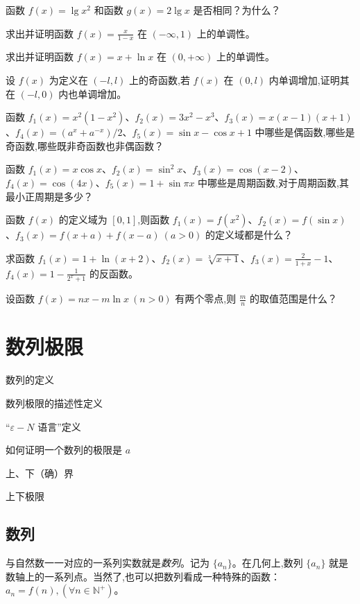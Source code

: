 \documentclass[lang=cn,10pt,twoside]{elegantbook}
\begin{document}
\begin{problemset}
  \item 函数 $f(x) = \lg x^2$ 和函数 $g(x) = 2 \lg x$ 是否相同？为什么？
  \item 求出并证明函数 $f(x) = \frac{x}{1-x}$ 在 $(-\infty, 1)$ 上的单调性。
  \item 求出并证明函数 $f(x) = x + \ln x$ 在 $(0, +\infty)$ 上的单调性。
  \item 设 $f(x)$ 为定义在 $(-l, l)$ 上的奇函数,若 $f(x)$ 在 $(0,l)$ 内单调增加,证明其在 $(-l, 0)$ 内也单调增加。
  \item 函数 $f_1(x) = x^2(1-x^2)$、$f_2(x) = 3x^2 - x^3$、$f_3(x) = x(x-1)(x+1)$、$f_4(x) = (a^x + a^{-x})/2$、$f_5(x) = \sin x - \cos x + 1$ 中哪些是偶函数,哪些是奇函数,哪些既非奇函数也非偶函数？
  \item 函数 $f_1(x) = x \cos x$、$f_2(x) = \sin^2 x$、$f_3(x) = \cos(x-2)$、$f_4(x) = \cos (4x)$、$f_5(x) = 1 + \sin \pi x$ 中哪些是周期函数,对于周期函数,其最小正周期是多少？
  \item 函数 $f(x)$ 的定义域为 $[0,1]$,则函数 $f_1(x)=f(x^2)$、$f_2(x)=f(\sin x)$、$f_3(x)=f(x+a) + f(x-a)\ (a>0)$ 的定义域都是什么？
  \item 求函数 $f_1(x) = 1 + \ln(x+2)$、$f_2(x) = \sqrt[3]{x+1}$、$f_3(x) = \frac{2}{1+x}-1$、$f_4(x) = 1-\frac{1}{2^x + 1}$ 的反函数。
  \item 设函数 $f(x) = nx - m \ln x \ (n>0)$ 有两个零点,则 $\frac mn$ 的取值范围是什么？ 
\end{problemset}

\chapter{数列极限}

\begin{introduction}
  \item 数列的定义
  \item 数列极限的描述性定义
  \item “$\varepsilon-N$ 语言”定义
  \item 如何证明一个数列的极限是 $a$
  \item 上、下（确）界
  \item 上下极限
\end{introduction}
\section{数列}
\begin{definition}[数列]


  与自然数一一对应的一系列实数就是\emph{数列}。记为 \emph{$\{a_n\}$}。在几何上,数列 $\{a_n\}$ 就是数轴上的一系列点。当然了,也可以把数列看成一种特殊的函数：$a_n = f(n), (\forall n \in \mathbb N^+) $。
\end{definition}
\end{document}

